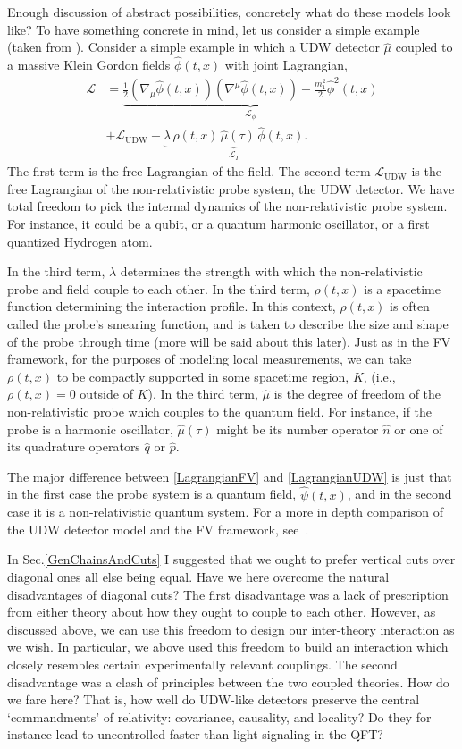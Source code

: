 \documentclass[12pt,prd,superscriptaddress,floatfix,amsmath,amssymb,amsfonts,nofootinbib]{revtex4-2}
\begin{document}
Enough discussion of abstract possibilities, concretely what do these models look like? To have something concrete in mind, let us consider a simple example (taken from \cite{TaleOfTwo}). Consider a simple example in which a UDW detector $\hat{\mu}$ coupled to a massive Klein Gordon fields $\hat\phi(t,x)$ with joint Lagrangian,
\begin{align}\label{LagrangianUDW}
\mathcal{L}
&=\underbrace{\frac{1}{2}(\nabla_\mu\hat\phi(t,x))(\nabla^\mu\hat\phi(t,x))
-\frac{m_1^2}{2}\hat\phi^2(t,x)}_{\mathcal{L}_\phi}\\
\nonumber
&+\mathcal{L}_\text{UDW}-\underbrace{\lambda\,\rho(t,x)\,\hat\mu(\tau)\,\hat\phi(t,x)}_{\mathcal{L}_I}.
\end{align}
The first term is the free Lagrangian of the field. The second term $\mathcal{L}_\text{UDW}$ is the free Lagrangian of the non-relativistic probe system, the UDW detector. We have total freedom to pick the internal dynamics of the non-relativistic probe system. For instance, it could be a qubit, or a quantum harmonic oscillator, or a first quantized Hydrogen atom. 

In the third term, $\lambda$ determines the strength with which the non-relativistic probe and field couple to each other. In the third term, $\rho(t,x)$ is a spacetime function determining the interaction profile. In this context, $\rho(t,x)$ is often called the probe's smearing function, and is taken to describe the size and shape of the probe through time (more will be said about this later). Just as in the FV framework, for the purposes of modeling local measurements, we can take $\rho(t,x)$ to be compactly supported in some spacetime region, $K$, (i.e., $\rho(t,x)=0$ outside of $K$). In the third term, $\hat{\mu}$ is the degree of freedom of the non-relativistic probe which couples to the quantum field. For instance, if the probe is a harmonic oscillator, $\hat{\mu}(\tau)$ might be its number operator $\hat{n}$ or one of its quadrature operators $\hat{q}$ or $\hat{p}$.

The major difference between \eqref{LagrangianFV} and \eqref{LagrangianUDW} is just that in the first case the probe system is a quantum field, $\hat\psi(t,x)$, and in the second case it is a non-relativistic quantum system. For a more in depth comparison of the UDW detector model and the FV framework, see~\cite{TaleOfTwo}.

In Sec.\ref{GenChainsAndCuts} I suggested that we ought to prefer vertical cuts over diagonal ones all else being equal. Have we here overcome the natural disadvantages of diagonal cuts? The first disadvantage was a lack of prescription from either theory about how they ought to couple to each other. However, as discussed above, we can use this freedom to design our inter-theory interaction as we wish. In particular, we above used this freedom to build an interaction which closely resembles certain experimentally relevant couplings. The second disadvantage was a clash of principles between the two coupled theories. How do we fare here? That is, how well do UDW-like detectors preserve the central `commandments' of relativity: covariance, causality, and locality? Do they for instance lead to uncontrolled faster-than-light signaling in the QFT?
\end{document}

